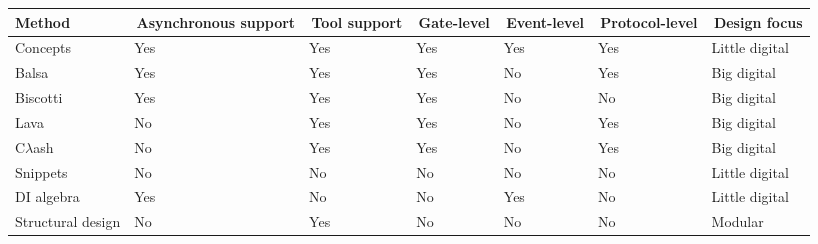 \documentclass[british, journal]{IEEEtran}
\begin{document}
\begin{table}[t]
	\centering
	\begin{tabular}[htb]{| m{2.6cm} | m{2.0cm} | m{1.3cm} | m{1.5cm} | m{1.5cm} | m{1.7cm} | m{1.9cm} |}
		\hline
		Method             & \,Asynchronous support & \,Tool support  & \,Gate-level & \,Event-level & \,Protocol-level  & \,Design focus \\ \hline \hline
		Concepts            & Yes                               & Yes                       & Yes                       & Yes                         & Yes                              & Little digital \\ \hline
		Balsa             & Yes                               & Yes                        & Yes                       & No                          & Yes                              & Big digital \\ \hline
		Biscotti            & Yes                               & Yes                         & Yes                       & No                          & No                               & Big digital \\ \hline
		Lava              & No                               & Yes                       & Yes                       & No                          & Yes                              & Big digital \\ \hline
		C$\lambda$ash     & No                               & Yes                        & Yes                       & No                          & Yes                              & Big digital \\ \hline
		Snippets          & No                                & No                        & No                        & No                          & No                               & Little digital \\ \hline
		DI algebra        & Yes                               & No                         & No                        & Yes                         & No                               & Little digital \\ \hline
		Structural design & No                                & Yes                        & No                        & No                          & No                               & Modular \\ \hline
	\end{tabular}
	\vspace{-3mm}
\end{table}
\end{document}
